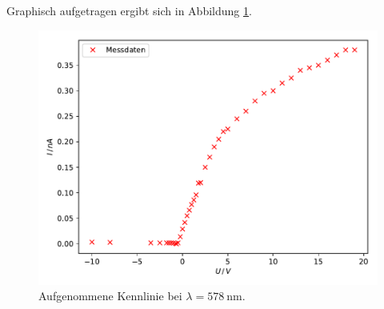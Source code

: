 Graphisch aufgetragen ergibt sich in Abbildung \ref{fig:plot3}. 

\begin{figure}
  \centering
  \includegraphics{content/plot3.pdf}
  \caption{Aufgenommene Kennlinie bei $\lambda=\SI{578}{\nano\meter}$.}
  \label{fig:plot3}
\end{figure}

